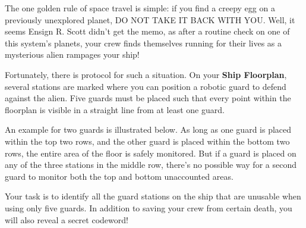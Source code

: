 The one golden rule of space travel is simple: if you find a creepy
egg on a previously unexplored planet, DO NOT TAKE IT BACK WITH YOU.
Well, it seems Ensign R. Scott didn't get the memo, as after
a routine check on one of this system's planets, your crew finds
themselves running for their lives as a mysterious alien
rampages your ship!

Fortunately, there is protocol for such a situation. On your
\textbf{Ship Floorplan}, several stations are marked where you
can position a robotic guard to defend against the alien. 
Five guards must be placed such that every point within the floorplan
is visible in a straight line from at least one guard.

An example for two guards is illustrated below. As long as one
guard is placed within the top two rows, and the other guard is
placed within the bottom two rows, the entire area of the floor
is safely monitored. But if a guard is placed on any of the
three stations in the middle row,
there's no possible way for a second guard to monitor both
the top and bottom unaccounted areas.

Your task is to identify all the guard stations on the ship that
are unusable when using only five guards. 
In addition to saving your crew from
certain death, you will also reveal a secret codeword!

